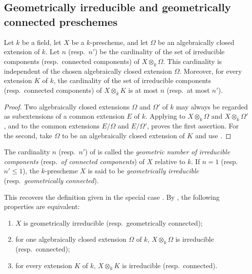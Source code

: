 \subsection{Geometrically irreducible and geometrically connected preschemes}
\label{subsection:IV.4.5}
\label{IV.4.5}

\begin{proposition}[4.5.1]
\label{IV.4.5.1}
Let $k$ be a field, let $X$ be a $k$-prescheme, and let $\Omega$ be an
algebraically closed extension of $k$.
Let $n$ (resp.\ $n'$) be the cardinality of the set of irreducible
components (resp.\ connected components) of $X\otimes_k\Omega$.
This cardinality is independent of the chosen algebraically closed
extension $\Omega$.
Moreover, for every extension $K$ of $k$, the cardinality of the set of
irreducible components (resp.\ connected components) of $X\otimes_k K$
is at most $n$ (resp.\ at most $n'$).
\end{proposition}

\begin{proof}
Two algebraically closed extensions $\Omega$ and $\Omega'$ of $k$ may
always be regarded as subextensions of a common extension $E$ of $k$.
Applying  to $X\otimes_k\Omega$ and
$X\otimes_k\Omega'$, and to the common extensions $E/\Omega$ and
$E/\Omega'$, proves the first assertion.
For the second, take $\Omega$ to be an algebraically closed extension of
$K$ and use .
\end{proof}

\begin{definition}[4.5.2]
\label{IV.4.5.2}
The cardinality $n$ (resp.\ $n'$) of  is called the
\emph{geometric number of irreducible components}
(resp.\ \emph{of connected components}) of $X$ relative to $k$.
If $n=1$ (resp.\ $n'\leq 1$), the $k$-prescheme $X$ is said to be
\emph{geometrically irreducible} (resp.\ \emph{geometrically
connected}).
\end{definition}

This recovers the definition given in the special case
.
By , the following properties are equivalent:
\begin{enumerate}
\item[\rm(a)]
\label{IV.4.5.2.a}
$X$ is geometrically irreducible (resp.\ geometrically connected);

\item[\rm(b)]
\label{IV.4.5.2.b}
for one algebraically closed extension $\Omega$ of $k$,
$X\otimes_k\Omega$ is irreducible (resp.\ connected);

\item[\rm(c)]
\label{IV.4.5.2.c}
for every extension $K$ of $k$, $X\otimes_k K$ is irreducible
(resp.\ connected).
\end{enumerate}

